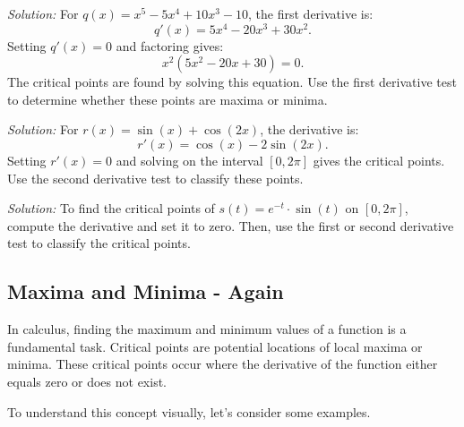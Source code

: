 \documentclass[a4paper,12pt]{book}
\newenvironment{solution}[1][]
{\par\noindent\textit{Solution:} \rmfamily}{\medskip}
\newcounter{example}
\begin{document}
\begin{solution}[to Problem 3]
For \( q(x) = x^5 - 5x^4 + 10x^3 - 10 \), the first derivative is:
\[ q'(x) = 5x^4 - 20x^3 + 30x^2. \]
Setting \( q'(x) = 0 \) and factoring gives:
\[ x^2(5x^2 - 20x + 30) = 0. \]
The critical points are found by solving this equation. Use the first derivative test to determine whether these points are maxima or minima.
\end{solution}

\begin{solution}[to Problem 4]
For \( r(x) = \sin(x) + \cos(2x) \), the derivative is:
\[ r'(x) = \cos(x) - 2\sin(2x). \]
Setting \( r'(x) = 0 \) and solving on the interval \([0, 2\pi]\) gives the critical points. Use the second derivative test to classify these points.
\end{solution}

\begin{solution}[to Problem 5]
To find the critical points of \( s(t) = e^{-t} \cdot \sin(t) \) on \([0, 2\pi]\), compute the derivative and set it to zero. Then, use the first or second derivative test to classify the critical points.
\end{solution}


\subsection{Maxima and Minima - Again}

In calculus, finding the maximum and minimum values of a function is a fundamental task. Critical points are potential locations of local maxima or minima. These critical points occur where the derivative of the function either equals zero or does not exist.

To understand this concept visually, let's consider some examples.
\end{document}
